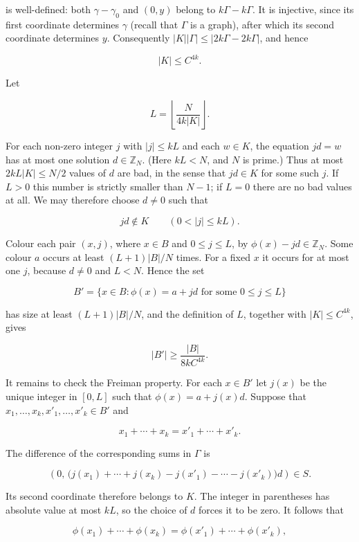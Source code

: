 \documentclass[10pt]{article}
\begin{document}
is well-defined: both $\gamma-\gamma_{0}$ and $(0,y)$ belong to
$k\Gamma-k\Gamma$.  It is injective, since its first coordinate determines
$\gamma$ (recall that $\Gamma$ is a graph), after which its second coordinate
determines $y$.  Consequently $|K||\Gamma|\leqslant
|2k\Gamma-2k\Gamma|$, and hence

$$
 |K|\leqslant C^{4k}.
$$

Let

$$
 L=\left\lfloor\frac{N}{4k|K|}\right\rfloor.
$$

For each non-zero integer $j$ with $|j|\leqslant kL$ and each $w\in K$, the
equation $jd=w$ has at most one solution $d\in\mathbb Z_N$.  (Here
$kL<N$, and $N$ is prime.)  Thus at most $2kL|K|\leqslant N/2$ values of
$d$ are bad, in the sense that $jd\in K$ for some such $j$.  If $L>0$ this
number is strictly smaller than $N-1$; if $L=0$ there are no bad values at
all.  We may therefore choose $d\ne0$ such that

$$
 jd\notin K\qquad(0<|j|\leqslant kL).
$$

Colour each pair $(x,j)$, where $x\in B$ and $0\leqslant j\leqslant L$, by
$\phi(x)-jd\in\mathbb Z_N$.  Some colour $a$ occurs at least
$(L+1)|B|/N$ times.  For a fixed $x$ it occurs for at most one $j$, because
$d\ne0$ and $L<N$.  Hence the set

$$
 B'=\{x\in B:\phi(x)=a+jd\text{ for some }0\leqslant j\leqslant L\}
$$

has size at least $(L+1)|B|/N$, and the definition of $L$, together with
$|K|\leqslant C^{4k}$, gives

$$
 |B'|\geqslant\frac{|B|}{8kC^{4k}}.
$$

It remains to check the Freiman property.  For each $x\in B'$ let $j(x)$ be
the unique integer in $[0,L]$ such that $\phi(x)=a+j(x)d$.  Suppose that
$x_{1},\ldots,x_{k},x'_{1},\ldots,x'_{k}\in B'$ and

$$
 x_{1}+\cdots+x_{k}=x'_{1}+\cdots+x'_{k}.
$$

The difference of the corresponding sums in $\Gamma$ is

$$
 \left(0,\,
   \bigl(j(x_{1})+\cdots+j(x_{k})
        -j(x'_{1})-\cdots-j(x'_{k})\bigr)d\right)\in S.
$$

Its second coordinate therefore belongs to $K$.  The integer in parentheses
has absolute value at most $kL$, so the choice of $d$ forces it to be zero.
It follows that

$$
 \phi(x_{1})+\cdots+\phi(x_{k})
   =\phi(x'_{1})+\cdots+\phi(x'_{k}),
$$
\end{document}
